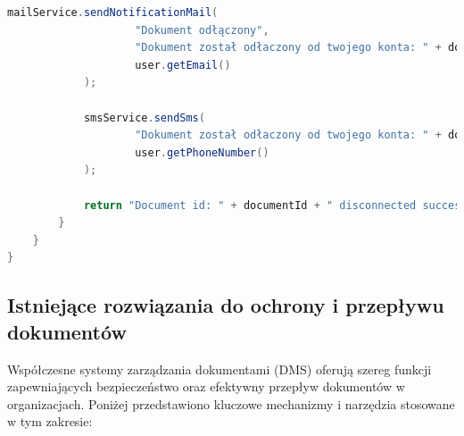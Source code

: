 \begin{lstlisting}[language=Java, caption=Metoda usuwania dokumetów i konretnych połaczeń z dokumentami w klasie \texttt{DocumentServiceImp}]
            mailService.sendNotificationMail(
                    "Dokument odłączony",
                    "Dokument został odłaczony od twojego konta: " + document.getDocumentName(),
                    user.getEmail()
            );

            smsService.sendSms(
                    "Dokument został odłaczony od twojego konta: " + document.getDocumentName(),
                    user.getPhoneNumber()
            );

            return "Document id: " + documentId + " disconnected successfully for user id: " + userId;
        }
    }
}
\end{lstlisting}


\subsection{Istniejące rozwiązania do ochrony i przepływu dokumentów}

Współczesne systemy zarządzania dokumentami (DMS) oferują szereg funkcji zapewniających bezpieczeństwo oraz efektywny przepływ dokumentów w organizacjach. Poniżej przedstawiono kluczowe mechanizmy i narzędzia stosowane w tym zakresie:

